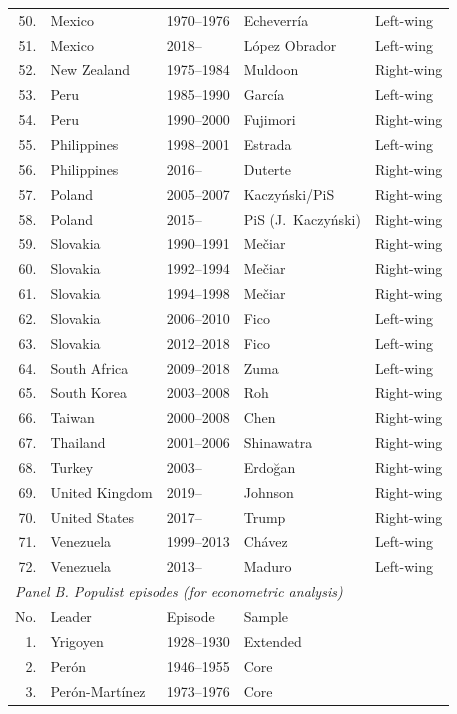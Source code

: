{\begin{longtable}{rp{2.2cm}p{2.4cm}p{3.2cm}l}
50. & Mexico & 1970--1976 & Echeverr\'ia & Left-wing \\
51. & Mexico & 2018-- & L\'opez Obrador & Left-wing \\
52. & New Zealand & 1975--1984 & Muldoon & Right-wing \\
53. & Peru & 1985--1990 & Garc\'ia & Left-wing \\
54. & Peru & 1990--2000 & Fujimori & Right-wing \\
55. & Philippines & 1998--2001 & Estrada & Left-wing \\
56. & Philippines & 2016-- & Duterte & Right-wing \\
57. & Poland & 2005--2007 & Kaczy\'nski/PiS & Right-wing \\
58. & Poland & 2015-- & PiS (J.\ Kaczy\'nski) & Right-wing \\
59. & Slovakia & 1990--1991 & Me\v{c}iar & Right-wing \\
60. & Slovakia & 1992--1994 & Me\v{c}iar & Right-wing \\
61. & Slovakia & 1994--1998 & Me\v{c}iar & Right-wing \\
62. & Slovakia & 2006--2010 & Fico & Left-wing \\
63. & Slovakia & 2012--2018 & Fico & Left-wing \\
64. & South Africa & 2009--2018 & Zuma & Left-wing \\
65. & South Korea & 2003--2008 & Roh & Right-wing \\
66. & Taiwan & 2000--2008 & Chen & Right-wing \\
67. & Thailand & 2001--2006 & Shinawatra & Right-wing \\
68. & Turkey & 2003-- & Erdo\u{g}an & Right-wing \\
69. & United Kingdom & 2019-- & Johnson & Right-wing \\
70. & United States & 2017-- & Trump & Right-wing \\
71. & Venezuela & 1999--2013 & Ch\'avez & Left-wing \\
72. & Venezuela & 2013-- & Maduro & Left-wing \\
\hline\hline
\multicolumn{5}{l}{\textit{Panel B. Populist episodes (for econometric analysis)}} \\
\hline
No. & Leader & Episode & Sample & \\
\hline
1. & Yrigoyen & 1928--1930 & Extended & \\
2. & Per\'on & 1946--1955 & Core & \\
3. & Per\'on-Mart\'inez & 1973--1976 & Core & \\

\end{longtable}}
